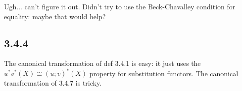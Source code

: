 \documentclass{article}
\newcommand{\blu}[1]{\textcolor{blue}{#1}}
\begin{document}






Ugh... can't figure it out. Didn't try to use the Beck-Chavalley condition for equality: maybe that would help?

\subsection*{3.4.4}

The canonical transformation of def 3.4.1 is easy: it just uses the $u^*v^*(X) \cong (u;v)^*(X)$ property for 
substitution functors. The canonical transformation of 3.4.7 is tricky.
\end{document}
